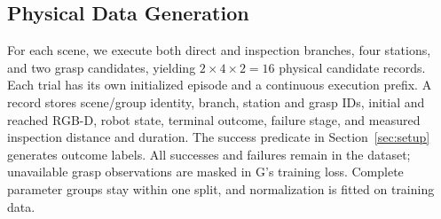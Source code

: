 \subsection{Physical Data Generation}
For each scene, we execute both direct and inspection branches, four stations,
and two grasp candidates, yielding $2\times4\times2=16$ physical candidate
records. Each trial has its own initialized episode and a continuous execution
prefix. A record stores scene/group identity, branch, station and grasp IDs,
initial and reached RGB-D, robot state, terminal outcome, failure stage, and
measured inspection distance and duration. The success predicate in
Section~\ref{sec:setup} generates outcome labels. All successes and failures
remain in the dataset; unavailable grasp observations are masked in G's
training loss. Complete parameter groups stay within one split, and
normalization is fitted on training data.
